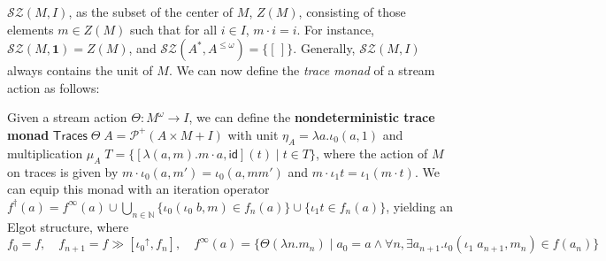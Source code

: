 \documentclass[acmsmall,screen,review]{acmart}
\newcommand{\mc}[1]{\ensuremath{\mathcal{#1}}}
\newcommand{\ms}[1]{\ensuremath{\mathsf{#1}}}
\newcommand{\nats}{\mathbb{N}}
\newcommand{\upg}[2]{{#1}^{\uparrow #2}}
\begin{document}
\(\mc{SZ}(M, I)\), as the subset of the center of \(M\), \(Z(M)\), consisting of
those elements \(m \in Z(M)\) such that for all \(i \in I\), \(m \cdot i = i\).
For instance, \(\mc{SZ}(M, \mathbf{1}) = Z(M)\), and \(\mc{SZ}(A^*, A^{\leq
\omega}) = \{[\,]\}\). Generally, \(\mc{SZ}(M, I)\) always contains
the unit of \(M\). We can now define the \textit{trace monad} of a stream action as follows:
\begin{definition}
  Given a stream action \(\Theta: M^\omega \to I\), we can define the
  \textbf{nondeterministic trace monad} \(\ms{Traces}\;\Theta\;A = \mc{P}^+(A
  \times M + I)\) with unit \(\eta_A = \lambda a.\iota_0 (a, 1)\) and
  multiplication
  \(
    \mu_A\;T = \{[\lambda (a, m). m \cdot a, \ms{id}](t) \mid t \in T\}
  \),
  where the action of \(M\) on traces is given by \(m \cdot \iota_0 (a, m') =
  \iota_0 (a, mm')\) and \(m \cdot \iota_1 t = \iota_1 (m \cdot t)\). We can
  equip this monad with an iteration operator \(f^\dagger(a) = f^\infty(a) \cup
  \bigcup_{n \in \nats}\{\iota_0 (\iota_0\;b, m) \in f_n(a)\} \cup \{\iota_1 t
  \in f_n(a)\}\), yielding an Elgot structure, where
  \[
    f_0 = f, \quad f_{n + 1} = f \gg [\upg{\iota_0}{}, f_n], \quad
    f^\infty(a) = \{\Theta (\lambda n. m_n) \mid a_0 = a \land \forall n, \exists a_{n + 1}. \iota_0 (\iota_1\;a_{n + 1}, m_n) \in f(a_n)\}
  \]
\end{definition}
\end{document}
